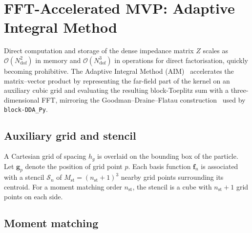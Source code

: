 \documentclass[11pt,a4paper]{article}
\begin{document}
\section{FFT-Accelerated MVP: Adaptive Integral Method}
\label{sec:aim}

Direct computation and storage of the dense impedance matrix $Z$ scales
as $\mathcal{O}(N_{\text{dof}}^{2})$ in memory and
$\mathcal{O}(N_{\text{dof}}^{3})$ in operations for direct factorisation,
quickly becoming prohibitive. The Adaptive Integral Method
(AIM)~\cite{ShengSong} accelerates the matrix--vector product by
representing the far-field part of the kernel on an auxiliary cubic
grid and evaluating the resulting block-Toeplitz sum with a
three-dimensional FFT, mirroring the Goodman--Draine--Flatau
construction~\cite{Goodman1991} used by
\texttt{block-DDA\_Py}.

\subsection{Auxiliary grid and stencil}
\label{sec:aim-grid}

A Cartesian grid of spacing $h_g$ is overlaid on the bounding box of
the particle. Let $\bm{g}_p$ denote the position of grid point $p$.
Each basis function $\bm{f}_n$ is associated with a stencil
$\mathcal{S}_n$ of $M_{\text{st}} = (n_{\text{st}}+1)^3$ nearby grid
points surrounding its centroid. For a moment matching order
$n_{\text{st}}$, the stencil is a cube with
$n_{\text{st}}+1$ grid points on each side.

\subsection{Moment matching}
\label{sec:aim-moments}
\end{document}
